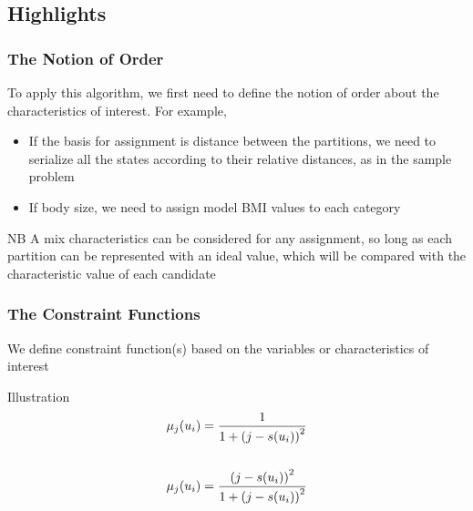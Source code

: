 \documentclass[10pt]{beamer}
\begin{document}
		\subsection{Highlights}
			\begin{frame}
				\frametitle{The Notion of Order}
				To apply this algorithm, we first need to define the notion of order about the characteristics of interest. For example, 
				\begin{itemize}
					\item If the basis for assignment is distance between the partitions, we need to serialize all the states according to their relative distances, as in the sample problem
					\item If body size, we need to assign model BMI values to each category
				\end{itemize}
				\vfill
				\begin{alertblock}{NB}
					A mix characteristics can be considered for any assignment, so long as each partition can be represented with an ideal value, which will be compared with the characteristic value of each candidate
				\end{alertblock}
			\end{frame}
			
			\begin{frame}
				\frametitle{The Constraint Functions}
				We define constraint function(s) based on the variables or characteristics of interest\\
				\vfill
				\begin{block}{Illustration}
					\begin{align}
						\mu_j(u_i) &= \frac{1}{1+\left( j - s(u_i) \right)^2}\\
						\notag \\
						\mu_j(u_i) &= \frac{\left( j - s(u_i) \right)^2}{1+\left( j - s(u_i) \right)^2} \\
						\notag
					\end{align}
				\end{block}
			\end{frame}
			
\end{document}
